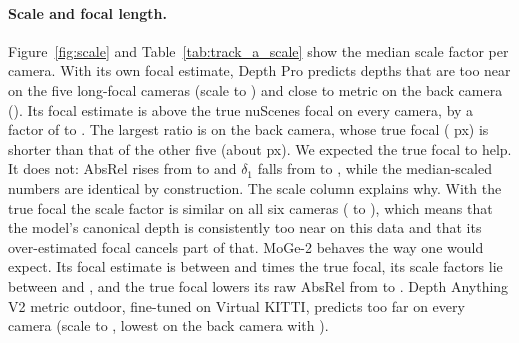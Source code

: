 \documentclass[10pt]{article}
\begin{document}
\paragraph{Scale and focal length.}
Figure~\ref{fig:scale} and Table~\ref{tab:track_a_scale} show the median scale factor per camera. With its
own focal estimate, Depth Pro predicts depths that are too near on the five long-focal cameras (scale
\DPscaleNonBackMin{} to \DPscaleNonBackMax{}) and close to metric on the back camera (\DPscaleBack). Its
focal estimate is above the true nuScenes focal on every camera, by a factor of \DPfocalRatioMin{} to
\DPfocalRatioMax. The largest ratio is on the back camera, whose true focal (\DPfocalTrueBack{} px) is
shorter than that of the other five (about \DPfocalTrueFront{} px). We expected the true focal to help. It
does not: AbsRel rises from \DPabsrelRaw{} to \GTFabsrelRaw{} and $\delta_1$ falls from \DPdOneRaw{} to
\GTFdOneRaw, while the median-scaled numbers are identical by construction. The scale column explains why.
With the true focal the scale factor is similar on all six cameras (\GTFscaleMin{} to \GTFscaleMax), which
means that the model's canonical depth is consistently too near on this data and that its over-estimated
focal cancels part of that. MoGe-2 behaves the way one would expect. Its focal estimate is between
\MOGEfocalRatioMin{} and \MOGEfocalRatioMax{} times the true focal, its scale factors lie between
\MOGEscaleMin{} and \MOGEscaleMax, and the true focal lowers its raw AbsRel from \MOGEabsrelRaw{} to
\MOGEGTFabsrelRaw. Depth Anything V2 metric outdoor, fine-tuned on Virtual KITTI, predicts too far on every
camera (scale \DAVscaleMin{} to \DAVscaleMax, lowest on the back camera with \DAVscaleBack).

\begin{table}[t]
\centering
\begin{subtable}[t]{\textwidth}
\centering
{}
\caption{Median per-image scale factor GT/pred and focal estimate over true focal. A scale of 1.0 means the metric output is already on the LiDAR scale.}
\label{tab:track_a_scale}
\end{subtable}\\[4pt]
\begin{subtable}[t]{\textwidth}
\centering
{}
\caption{AbsRel raw / median-scaled.}
\label{tab:track_a_per_camera}
\end{subtable}
\caption{Track A per camera (F front, FL/FR front left/right, B back, BL/BR back left/right).}
\label{tab:track_a_cam}
\end{table}
\end{document}

